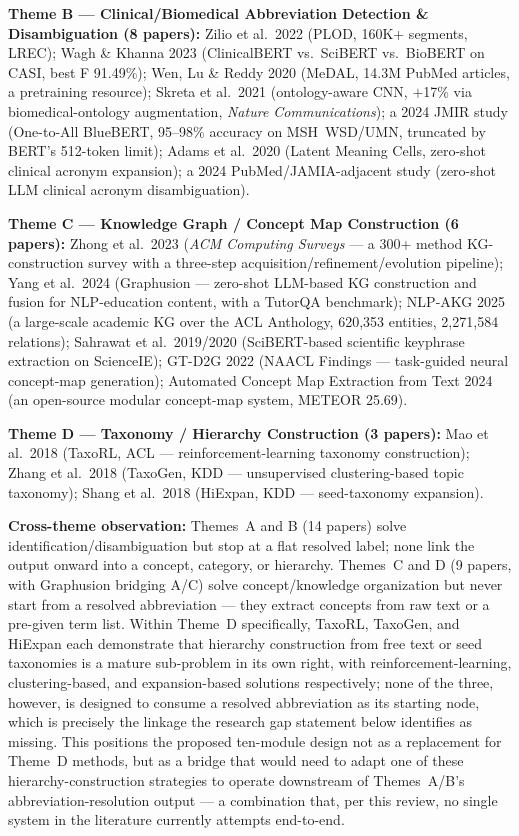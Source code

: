 \documentclass[10pt,conference]{IEEEtran}
\begin{document}
\textbf{Theme B --- Clinical/Biomedical Abbreviation Detection \& Disambiguation (8 papers):} Zilio et al.\ 2022 (PLOD, 160K+ segments, LREC); Wagh \& Khanna 2023 (ClinicalBERT vs.\ SciBERT vs.\ BioBERT on CASI, best F 91.49\%); Wen, Lu \& Reddy 2020 (MeDAL, 14.3M PubMed articles, a pretraining resource); Skreta et al.\ 2021 (ontology-aware CNN, $+$17\% via biomedical-ontology augmentation, \emph{Nature Communications}); a 2024 JMIR study (One-to-All BlueBERT, 95--98\% accuracy on MSH~WSD/UMN, truncated by BERT's 512-token limit); Adams et al.\ 2020 (Latent Meaning Cells, zero-shot clinical acronym expansion); a 2024 PubMed/JAMIA-adjacent study (zero-shot LLM clinical acronym disambiguation).

\textbf{Theme C --- Knowledge Graph / Concept Map Construction (6 papers):} Zhong et al.\ 2023 (\emph{ACM Computing Surveys} --- a 300+ method KG-construction survey with a three-step acquisition/refinement/evolution pipeline); Yang et al.\ 2024 (Graphusion --- zero-shot LLM-based KG construction and fusion for NLP-education content, with a TutorQA benchmark); NLP-AKG 2025 (a large-scale academic KG over the ACL Anthology, 620{,}353 entities, 2{,}271{,}584 relations); Sahrawat et al.\ 2019/2020 (SciBERT-based scientific keyphrase extraction on ScienceIE); GT-D2G 2022 (NAACL Findings --- task-guided neural concept-map generation); Automated Concept Map Extraction from Text 2024 (an open-source modular concept-map system, METEOR 25.69).

\textbf{Theme D --- Taxonomy / Hierarchy Construction (3 papers):} Mao et al.\ 2018 (TaxoRL, ACL --- reinforcement-learning taxonomy construction); Zhang et al.\ 2018 (TaxoGen, KDD --- unsupervised clustering-based topic taxonomy); Shang et al.\ 2018 (HiExpan, KDD --- seed-taxonomy expansion).

\textbf{Cross-theme observation:} Themes~A and B (14 papers) solve identification/disambiguation but stop at a flat resolved label; none link the output onward into a concept, category, or hierarchy. Themes~C and D (9 papers, with Graphusion bridging A/C) solve concept/knowledge organization but never start from a resolved abbreviation --- they extract concepts from raw text or a pre-given term list. Within Theme~D specifically, TaxoRL, TaxoGen, and HiExpan each demonstrate that hierarchy construction from free text or seed taxonomies is a mature sub-problem in its own right, with reinforcement-learning, clustering-based, and expansion-based solutions respectively; none of the three, however, is designed to consume a resolved abbreviation as its starting node, which is precisely the linkage the research gap statement below identifies as missing. This positions the proposed ten-module design not as a replacement for Theme~D methods, but as a bridge that would need to adapt one of these hierarchy-construction strategies to operate downstream of Themes~A/B's abbreviation-resolution output --- a combination that, per this review, no single system in the literature currently attempts end-to-end.
\end{document}
